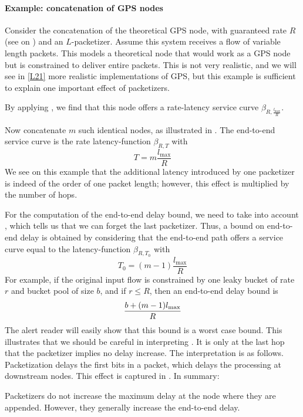 \paragraph{Example: concatenation of GPS nodes}

Consider the concatenation of the theoretical GPS node, with
guaranteed rate $R$ (see  on
) and an $L$-packetizer. Assume this system
receives a flow of variable length packets. This models a
theoretical node that would work as a GPS node but is constrained
to deliver entire packets. This is not very realistic, and we will
see in \cref{L21} more realistic implementations of GPS, but this
example is sufficient to explain one important effect of
packetizers.

By applying , we find that this node offers a
rate-latency service curve $\beta_{R,\frac{l_{\max}}{R}}$.
\begin{figure}[htbp]
\end{figure}
Now concatenate $m$ such identical nodes, as illustrated in
. The end-to-end service curve is the rate
latency-function $\beta_{R, T}$ with
$$
 T = m \frac{l_{\max}}{R}
$$
We see on this example that the additional latency introduced by
one packetizer is indeed of the order of one packet length;
however, this effect is multiplied by the number of hops.

For the computation of the end-to-end delay bound, we need to take
into account , which tells us that we can
forget the last packetizer. Thus, a bound on end-to-end delay is
obtained by considering that the end-to-end path offers a service
curve equal to the latency-function $\beta_{R, T_0}$ with
$$
 T_0 = (m-1) \frac{l_{\max}}{R}
$$
For example, if the original input flow is constrained by one
leaky bucket of rate $r$ and bucket pool of size $b$, and if $r\leq R$, then an
end-to-end delay bound is
\begin{equation}\mylabel{eq-e2edelvlp}
\frac{b + (m-1) l_{\max}}{R}
\end{equation}
The alert reader will easily show that this bound is a worst case
bound. This illustrates that we should be careful in interpreting
. It is only at the last hop that the
packetizer implies no delay increase. The interpretation is as
follows. Packetization delays the first bits in a packet, which
delays the processing at downstream nodes. This effect is captured
in . In summary:
\begin{remark}
Packetizers do not increase the maximum delay at the node where
they are appended. However, they generally increase the end-to-end
delay.
\end{remark}

